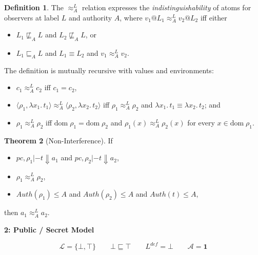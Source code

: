 \documentclass{article}
\makeatletter
\newcommand{\at}{\ensuremath{{\scriptstyle{@}}}}
\newcommand{\pc}{\ensuremath{{\mathit{pc}}}}
\theoremstyle{definition}
\newtheorem{theorem}{Theorem}
\newtheorem{definition}[theorem]{Definition}
\makeatother
\begin{document}
\begin{definition}
  The $\approx^{L}_{A}$ relation expresses the \emph{indistinguishability} of
  atoms for observers at label $L$ and authority $A$, where
  $v_1 \at L_1 \approx^{L}_{A} v_2 \at L_2$ iff either
  \begin{itemize}
  \item $L_1 \not\sqsubseteq_{A} L$ and $L_2 \not\sqsubseteq_{A} L$, or
  \item $L_1 \sqsubseteq_{A} L$ and $L_1 \equiv L_2$ and
    $v_1 \approx^{L}_{A} v_2$.
  \end{itemize}
  The definition is mutually recursive with values and environments:
  \begin{itemize}
  \item
    $c_1 \approx^{L}_{A} c_2$ iff $c_1 = c_2$,
  \item
    $\langle{\rho_1, \lambda{x_1}.\, t_1\rangle} \approx^{L}_{A}
    \langle{\rho_2, \lambda{x_2}.\, t_2\rangle}$ iff
    $\rho_1 \approx^{L}_{A} \rho_2$ and
    $\lambda{x_1}.\, t_1 \equiv \lambda{x_2}.\, t_2$; and
  \item
    $\rho_1 \approx^{L}_{A} \rho_2$ iff
    $\mathrm{dom}\; \rho_1 = \mathrm{dom}\; \rho_2$ and
    $\rho_1(x) \approx^{L}_{A} \rho_2(x)$
    for every $x \in \mathrm{dom}\; \rho_1$.
  \end{itemize}
\end{definition}

\begin{theorem}[Non-Interference]
  If
  \begin{itemize}
  \item $\pc, \rho_1 |- t \Downarrow a_1$ and 
    $\pc, \rho_2 |- t \Downarrow a_2$,
  \item $\rho_1 \approx^{L}_{A} \rho_2$,
  \item $\mathit{Auth}(\rho_1) \leq A$ and $\mathit{Auth}(\rho_2) \leq A$ and
    $\mathit{Auth}(t) \leq A$,
  \end{itemize}
  then $a_1 \approx^{L}_{A} a_2$.
\end{theorem}

\pagebreak

\begin{flushleft}
  \textbf{2: Public / Secret Model}
\end{flushleft}
\[
\mathcal{L} = \{ \bot, \top \}
\qquad
\bot \sqsubseteq \top
\qquad
L^{\mathit{def}} = \bot
\qquad
\mathcal{A} = \mathbf{1}
\]
\end{document}
